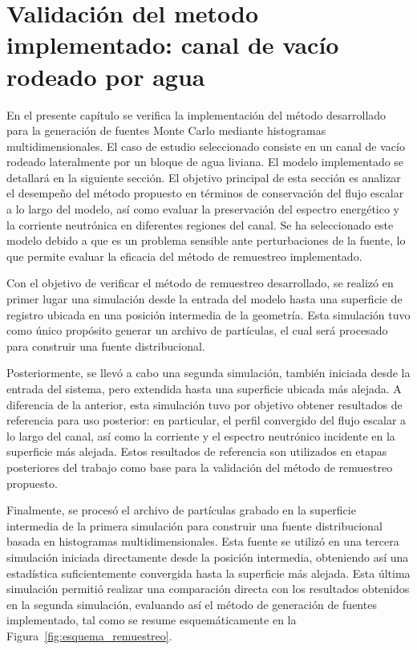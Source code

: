\chapter{Validación del metodo implementado: canal de vacío rodeado por agua}

En el presente capítulo se verifica la implementación del método desarrollado para la generación de fuentes Monte Carlo mediante histogramas multidimensionales. El caso de estudio seleccionado consiste en un canal de vacío rodeado lateralmente por un bloque de agua liviana. El modelo implementado se detallará en la siguiente sección. El objetivo principal de esta sección es analizar el desempeño del método propuesto en términos de conservación del flujo escalar a lo largo del modelo, así como evaluar la preservación del espectro energético y la corriente neutrónica en diferentes regiones del canal. Se ha seleccionado este modelo debido a que es un problema sensible ante perturbaciones de la fuente, lo que permite evaluar la eficacia del método de remuestreo implementado.

Con el objetivo de verificar el método de remuestreo desarrollado, se realizó en primer lugar una simulación desde la entrada del modelo hasta una superficie de registro ubicada en una posición intermedia de la geometría. Esta simulación tuvo como único propósito generar un archivo de partículas, el cual será procesado para construir una fuente distribucional.

Posteriormente, se llevó a cabo una segunda simulación, también iniciada desde la entrada del sistema, pero extendida hasta una superficie ubicada más alejada. A diferencia de la anterior, esta simulación tuvo por objetivo obtener resultados de referencia para uso posterior: en particular, el perfil convergido del flujo escalar a lo largo del canal, así como la corriente y el espectro neutrónico incidente en la superficie más alejada. Estos resultados de referencia son utilizados en etapas posteriores del trabajo como base para la validación del método de remuestreo propuesto.

Finalmente, se procesó el archivo de partículas grabado en la superficie intermedia de la primera simulación para construir una fuente distribucional basada en histogramas multidimensionales. Esta fuente se utilizó en una tercera simulación iniciada directamente desde la posición intermedia, obteniendo así una estadística suficientemente convergida hasta la superficie más alejada. Esta última simulación permitió realizar una comparación directa con los resultados obtenidos en la segunda simulación, evaluando así el método de generación de fuentes implementado, tal como se resume esquemáticamente en la Figura~\ref{fig:esquema_remuestreo}.

